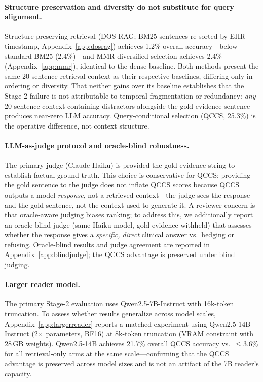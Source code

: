 \documentclass{article}
\begin{document}
\paragraph{Structure preservation and diversity do not substitute for query alignment.}
Structure-preserving retrieval (DOS-RAG; BM25 sentences re-sorted by EHR timestamp,
Appendix~\ref{app:dosrag}) achieves 1.2\% overall accuracy---below standard BM25
(2.4\%)---and MMR-diversified selection achieves 2.4\% (Appendix~\ref{app:mmr}),
identical to the dense baseline. Both methods present the same 20-sentence
retrieval context as their respective baselines, differing only in ordering or
diversity. That neither gains over its baseline establishes that the Stage-2
failure is not attributable to temporal fragmentation or redundancy: \emph{any}
20-sentence context containing distractors alongside the gold evidence sentence
produces near-zero LLM accuracy. Query-conditional selection (QCCS, 25.3\%) is
the operative difference, not context structure.

\paragraph{LLM-as-judge protocol and oracle-blind robustness.}
The primary judge (Claude Haiku) is provided the gold evidence string to establish
factual ground truth. This choice is conservative for QCCS: providing the gold
sentence to the judge does not inflate QCCS scores because QCCS outputs a model
\emph{response}, not a retrieved context---the judge sees the response and the
gold sentence, not the context used to generate it. A reviewer concern is that
oracle-aware judging biases ranking; to address this, we additionally report an
oracle-blind judge (same Haiku model, gold evidence withheld) that assesses whether
the response gives a \emph{specific, direct} clinical answer vs.\ hedging or refusing.
Oracle-blind results and judge agreement are reported in Appendix~\ref{app:blindjudge};
the QCCS advantage is preserved under blind judging.

\paragraph{Larger reader model.}
The primary Stage-2 evaluation uses Qwen2.5-7B-Instruct with 16k-token truncation.
To assess whether results generalize across model scales,
Appendix~\ref{app:largerreader} reports a matched experiment using
Qwen2.5-14B-Instruct (2$\times$ parameters, BF16) at 8k-token truncation
(VRAM constraint with 28\,GB weights).
Qwen2.5-14B achieves 21.7\% overall QCCS accuracy vs.\ $\leq$3.6\% for all
retrieval-only arms at the same scale---confirming that the QCCS advantage is
preserved across model sizes and is not an artifact of the 7B reader's capacity.
\end{document}
